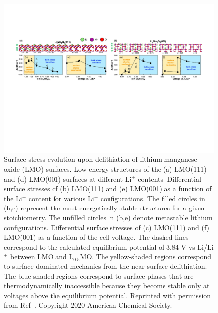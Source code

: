 \documentclass[../main.tex]{subfiles}
\begin{document}
\begin{figure}
    \centering
    \includegraphics[scale=0.6]{figures/cathode_surface_stress.pdf}
    \caption{Surface stress evolution upon delithiation of lithium manganese oxide (LMO) surfaces. Low energy structures of the (a) LMO(111) and (d) LMO(001) surfaces at different Li$^+$ contents. Differential surface stresses of (b) LMO(111) and (e) LMO(001) as a function of the Li$^+$ content for various Li$^+$ configurations. The filled circles in (b,e) represent the most energetically stable structures for a given stoichiometry. The unfilled circles in (b,e) denote metastable lithium configurations. Differential surface stresses of (c) LMO(111) and (f) LMO(001) as a function of the cell voltage. The dashed lines correspond to the calculated equilibrium potential of 3.84 V vs Li/Li$^+$ between LMO and L$_{0.5}$MO. The yellow-shaded regions correspond to surface-dominated mechanics from the near-surface delithiation. The blue-shaded regions correspond to surface phases that are thermodynamically inaccessible because they become stable only at voltages above the equilibrium potential. Reprinted with permission from Ref~\cite{warburton2020oriented}. Copyright 2020 American Chemical Society.}
    \label{fig:cathode_surface_stress}
\end{figure}
\end{document}
